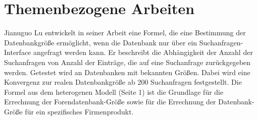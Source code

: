 

\section{Themenbezogene Arbeiten}

Jianuguo Lu \cite{lu2008efficient} entwickelt in seiner Arbeit eine Formel, die eine Bestimmung der Datenbankgröße ermöglicht, wenn die Datenbank nur über ein Suchanfragen-Interface angefragt werden kann. Er beschreibt die Abhängigkeit der Anzahl der Suchanfragen von Anzahl der Einträge, die auf eine Suchanfrage zurückgegeben werden. Getestet wird an Datenbanken mit bekannten Größen. Dabei wird eine Konvergenz zur realen Datenbankgröße ab 200 Suchanfragen festgestellt. Die Formel aus dem heterogenen Modell (Seite 1) ist die Grundlage für die Errechnung der Forendatenbank-Größe sowie für die Errechnung der Datenbank-Größe für ein spezifisches Firmenprodukt.

